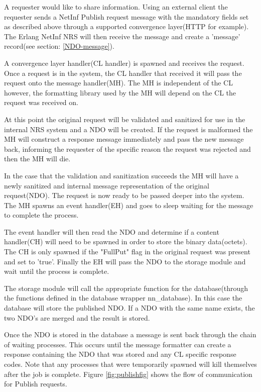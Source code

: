 A requester would like to share information. Using an external client the requester sends a NetInf Publish request message with the mandatory fields set as described above through a supported convergence layer(HTTP for example). The Erlang NetInf NRS will then receive the message and create a 'message' record(see section: \ref{NDO-message}).

A convergence layer handler(CL handler) is spawned and receives the request.
Once a request is in the system, the CL handler that received it will pass the request onto the message handler(MH). The MH is independent of the CL however, the formatting library used by the MH will depend on the CL the request was received on.

At this point the original request will be validated and sanitized for use in the internal NRS system and a NDO will be created. If the request is malformed the MH will construct a response message immediately and pass the new message back, informing the requester of the specific reason the request was rejected and then the MH will die. 

In the case that the validation and sanitization succeeds the MH will have a newly sanitized and internal message representation of the original request(NDO). The request is now ready to be passed deeper into the system. The MH spawns an event handler(EH) and goes to sleep waiting for the message to complete the process. 

The event handler will then read the NDO and determine if a content handler(CH) will need to be spawned in order to store the binary data(octets). The CH is only spawned if the "FullPut" flag in the original request was present and set to 'true'. Finally the EH will pass the NDO to the storage module and wait until the process is complete.

The storage module will call the appropriate function for the database(through the functions defined in the database wrapper nn\_database). In this case the database will store the published NDO. If a NDO with the same name exists, the two NDO's are merged and the result is stored.

Once the NDO is stored in the database a message is sent back through the chain of waiting processes. This occurs until the message formatter can create a response containing the NDO that was stored and any CL specific response codes. Note that any processes that were temporarily spawned will kill themselves after the job is complete. Figure \ref{fig:publishfig} shows the flow of communication for Publish requests.  


